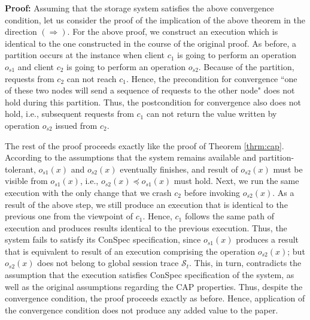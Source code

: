 \documentclass[journal,compsoc]{IEEEtran}
\begin{document}
  \textbf{Proof:}  Assuming that the storage system satisfies the above convergence condition, let us consider the proof of the implication of the above theorem in the direction $(\Rightarrow)$. For the above proof, we construct an execution which is identical to the one constructed in the course of the original proof. As before, a partition occurs at the instance when  client $c_1$ is going to perform an operation $o_{s1}$ and client $c_2$ is going to perform an operation $o_{s2}$. Because of the partition, requests from $c_2$ can not reach $c_1$. Hence, the precondition for convergence ``one of these two nodes will send a sequence of requests to the other node" does not hold during this partition. Thus, the postcondition for convergence also does not hold, i.e., subsequent requests from $c_1$ can not return the value written by operation $o_{s2}$ issued from $c_2$. 
 \par The rest of the proof proceeds exactly like the proof of Theorem \ref{thrm:cap}. According to the assumptions that the system remains available and partition-tolerant, $o_{s1}(x)$ and $o_{s2}(x)$ eventually finishes, and result of $o_{s2}(x)$ must be visible from $o_{s1}(x)$, i.e., $o_{s2}(x)\preccurlyeq o_{s1}(x)$ must hold. Next, we run the same execution with the only change that we crash $c_2$ before invoking $o_{s2}(x)$. As a result of the above step, we still produce an execution that is identical to the previous one from the viewpoint of $c_1$. Hence, $c_1$ follows the same path of execution and produces results identical to the previous execution. Thus, the system fails to satisfy its ConSpec specification, since $o_{s1}(x)$  produces a result that is equivalent to result of an execution comprising the operation $o_{s2}(x)$; but  $o_{s2}(x)$ does not belong to global session trace $\mathcal{S}_t$. This, in turn, contradicts the assumption that the execution satisfies ConSpec specification of the system, as well as the original assumptions regarding the CAP properties. Thus, despite the convergence condition, the proof proceeds exactly as before. Hence, application of the convergence condition does not produce any added value to the paper.  
\end{document}
